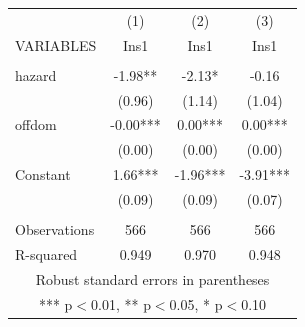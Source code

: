 \documentclass[]{article}
\begin{document}
\begin{tabular}{lccc} \hline
 & (1) & (2) & (3) \\
VARIABLES & Ins1 & Ins1 & Ins1 \\ \hline
 &  &  &  \\
hazard & -1.98** & -2.13* & -0.16 \\
 & (0.96) & (1.14) & (1.04) \\
offdom & -0.00*** & 0.00*** & 0.00*** \\
 & (0.00) & (0.00) & (0.00) \\
Constant & 1.66*** & -1.96*** & -3.91*** \\
 & (0.09) & (0.09) & (0.07) \\
 &  &  &  \\
Observations & 566 & 566 & 566 \\
 R-squared & 0.949 & 0.970 & 0.948 \\ \hline
\multicolumn{4}{c}{ Robust standard errors in parentheses} \\
\multicolumn{4}{c}{ *** p$<$0.01, ** p$<$0.05, * p$<$0.10} \\
\end{tabular}
\end{document}
